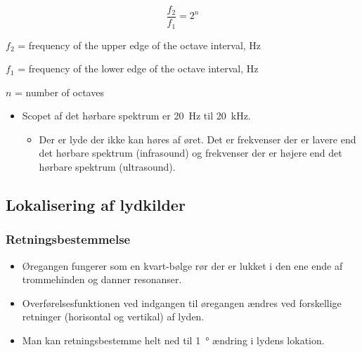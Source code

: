\begin{equation}\label{eq:octave}
\frac{f_2}{f_1} = 2^n
\end{equation}

\begin{description}
	\item $f_2$ = frequency of the upper edge of the octave interval, \si{\hertz}
	\item $f_1$ = frequency of the lower edge of the octave interval, \si{\hertz}
	\item $n$ = number of octaves
\end{description}

\begin{itemize}
	\item Scopet af det hørbare spektrum er \SI{20}{\hertz} til \SI{20}{\kilo\hertz}.
	\begin{itemize}
		\item Der er lyde der ikke kan høres af øret. Det er frekvenser der er lavere end det hørbare spektrum (infrasound) og frekvenser der er højere end det hørbare spektrum (ultrasound).
	\end{itemize}
\end{itemize}

\subsection{Lokalisering af lydkilder}
\subsubsection{Retningsbestemmelse}
\begin{itemize}
	\item Øregangen fungerer som en kvart-bølge rør der er lukket i den ene ende af trommehinden og danner resonanser.
	\item Overførelsesfunktionen ved indgangen til øregangen ændres ved forskellige retninger (horisontal og vertikal) af lyden.
	\item Man kan retningsbestemme helt ned til \SI{1}{\degree} ændring i lydens lokation.
\end{itemize}
